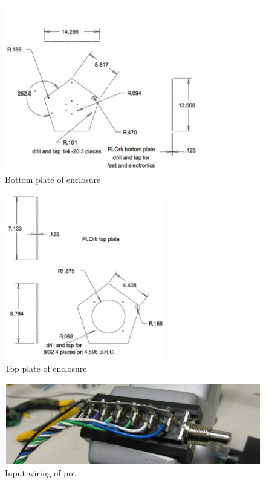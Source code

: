 \begin{figure}[t]
\centering
\includegraphics[width=85mm]{img-7-eps-converted-to-crop.pdf}
\caption{Bottom plate of enclosure}
\label{Smallwood:img-7}
\end{figure}

\begin{figure}[t]
\centering
\includegraphics[width=70mm]{img-8-eps-converted-to-crop.pdf}
\caption{Top plate of enclosure}
\label{Smallwood:img-8}
\end{figure}

\begin{figure}[t]
\centering
\includegraphics[width=\textwidth]{img-9-eps-converted-to-crop.pdf}
\caption{Input wiring of pot}
\label{Smallwood:img-9}
\end{figure}

